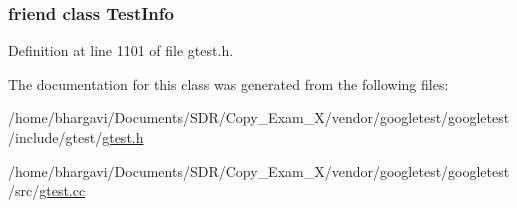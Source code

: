 \subsubsection[{\texorpdfstring{Test\+Info}{TestInfo}}]{\setlength{\rightskip}{0pt plus 5cm}friend class {\bf Test\+Info}\hspace{0.3cm}{\ttfamily [friend]}}\hypertarget{classtesting_1_1_test_event_listeners_a4c49c2cdb6c328e6b709b4542f23de3c}{}\label{classtesting_1_1_test_event_listeners_a4c49c2cdb6c328e6b709b4542f23de3c}


Definition at line 1101 of file gtest.\+h.



The documentation for this class was generated from the following files\+:\begin{DoxyCompactItemize}
\item 
/home/bhargavi/\+Documents/\+S\+D\+R/\+Copy\+\_\+\+Exam\+\_\+X/vendor/googletest/googletest/include/gtest/\hyperlink{gtest_8h}{gtest.\+h}\item 
/home/bhargavi/\+Documents/\+S\+D\+R/\+Copy\+\_\+\+Exam\+\_\+X/vendor/googletest/googletest/src/\hyperlink{gtest_8cc}{gtest.\+cc}\end{DoxyCompactItemize}
